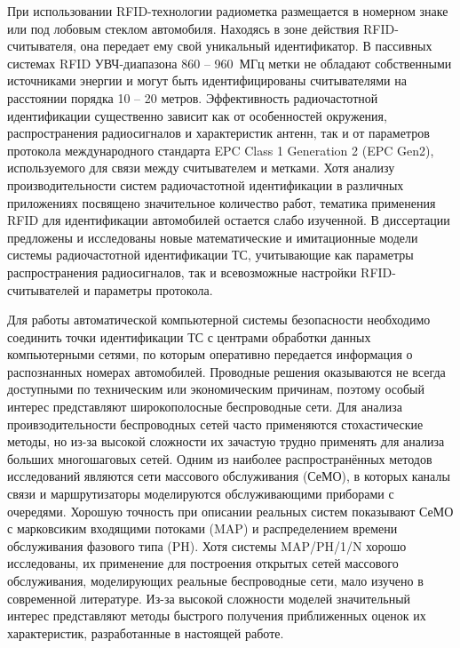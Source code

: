 При использовании RFID-технологии радиометка размещается в номерном знаке или под лобовым стеклом автомобиля. Находясь в зоне действия RFID-считывателя, она передает ему свой уникальный идентификатор. В пассивных системах RFID УВЧ-диапазона 860 -- 960~МГц метки не обладают собственными источниками энергии и могут быть идентифицированы считывателями на расстоянии порядка 10 -- 20 метров. Эффективность радиочастотной идентификации существенно зависит как от особенностей окружения, распространения радиосигналов и характеристик антенн, так и от параметров протокола международного стандарта EPC Class 1 Generation 2 (EPC Gen2), используемого для связи между считывателем и метками. Хотя анализу производительности систем радиочастотной идентификации в различных приложениях посвящено значительное количество работ, тематика применения RFID для идентификации автомобилей остается слабо изученной. В диссертации предложены и исследованы новые математические и имитационные модели системы радиочастотной идентификации ТС, учитывающие как параметры распространения радиосигналов, так и всевозможные настройки RFID-считывателей и параметры протокола.

Для работы автоматической компьютерной системы безопасности необходимо соединить точки идентификации ТС с центрами обработки данных компьютерными сетями, по которым оперативно передается информация о распознанных номерах автомобилей. Проводные решения оказываются не всегда доступными по техническим или экономическим причинам, поэтому особый интерес представляют широкополосные беспроводные сети. Для анализа проивзодительности беспроводных сетей часто применяются стохастические методы, но из-за высокой сложности их зачастую трудно применять для анализа больших многошаговых сетей. Одним из наиболее распространённых методов исследований являются сети массового обслуживания (СеМО), в которых каналы связи и маршрутизаторы моделируются обслуживающими приборами с очередями. Хорошую точность при описании реальных систем показывают СеМО с марковсиким входящими потоками (MAP) и распределением времени обслуживания фазового типа (PH). Хотя системы MAP/PH/1/N хорошо исследованы, их применение для построения открытых сетей массового обслуживания, моделирующих реальные беспроводные сети, мало изучено в современной литературе. Из-за высокой сложности моделей значительный интерес представляют методы быстрого получения приближенных оценок их характеристик, разработанные в настоящей работе.



